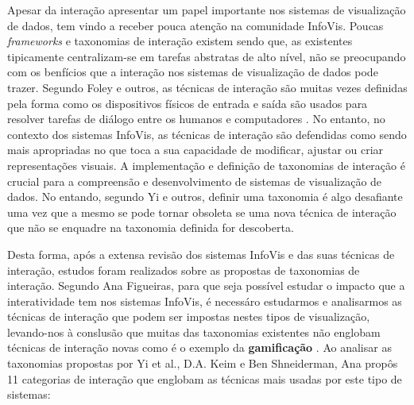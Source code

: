Apesar da interação apresentar um papel importante nos sistemas de visualização de dados, tem vindo a receber pouca atenção na comunidade \gls{InfoVis}. Poucas \textit{frameworks} e taxonomias de interação existem sendo que, as existentes tipicamente centralizam-se em tarefas abstratas de alto nível, não se preocupando com os benfícios que a interação nos sistemas de visualização de dados pode trazer. Segundo Foley e outros, as técnicas de interação são muitas vezes definidas pela forma como os dispositivos físicos de entrada e saída são usados para resolver tarefas de diálogo entre os humanos e computadores \cite{foley1996computer}. No entanto, no contexto dos sistemas \gls{InfoVis}, as técnicas de interação são defendidas como sendo mais apropriadas no que toca a sua capacidade de modificar, ajustar ou criar representações visuais. A implementação e definição de taxonomias de interação é crucial para a compreensão e desenvolvimento de sistemas de visualização de dados. No entando, segundo Yi e outros, definir uma taxonomia é algo desafiante uma vez que a mesmo se pode tornar obsoleta se uma nova técnica de interação que não se enquadre na taxonomia definida for descoberta.

Desta forma, após a extensa revisão dos sistemas \gls{InfoVis} e das suas técnicas de interação, estudos foram realizados sobre as propostas de taxonomias de interação. Segundo Ana Figueiras, para que seja possível estudar o impacto que a interatividade tem nos sistemas \gls{InfoVis}, é necessáro estudarmos e analisarmos as técnicas de interação que podem ser impostas nestes tipos de visualização, levando-nos à conslusão que muitas das taxonomias existentes não englobam técnicas de interação novas como é o exemplo da \textbf{gamificação} \cite{figueiras2015towards}. Ao analisar as taxonomias propostas por Yi et al., D.A. Keim  e Ben Shneiderman, Ana propôs 11 categorias de interação que englobam as técnicas mais usadas por este tipo de sistemas:


